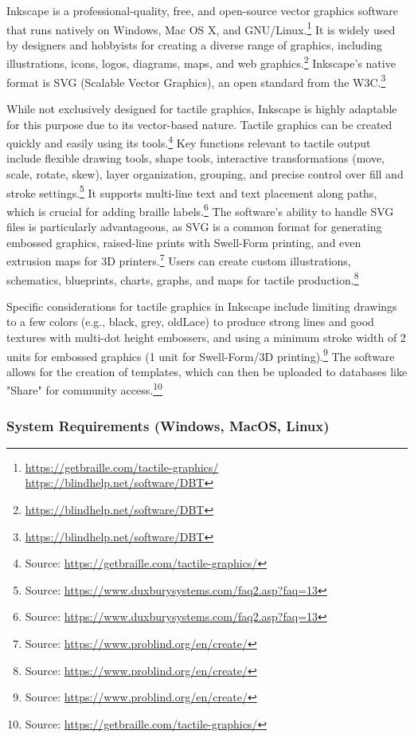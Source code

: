 Inkscape is a professional-quality, free, and open-source vector graphics software that runs natively on Windows, Mac OS X, and GNU/Linux.\footnote{\url{https://getbraille.com/tactile-graphics/} \url{https://blindhelp.net/software/DBT}} It is widely used by designers and hobbyists for creating a diverse range of graphics, including illustrations, icons, logos, diagrams, maps, and web graphics.\footnote{\url{https://blindhelp.net/software/DBT}} Inkscape's native format is SVG (Scalable Vector Graphics), an open standard from the W3C.\footnote{\url{https://blindhelp.net/software/DBT}}

While not exclusively designed for tactile graphics, Inkscape is highly adaptable for this purpose due to its vector-based nature. Tactile graphics can be created quickly and easily using its tools.\footnote{Source:  \url{https://getbraille.com/tactile-graphics/}} Key functions relevant to tactile output include flexible drawing tools, shape tools, interactive transformations (move, scale, rotate, skew), layer organization, grouping, and precise control over fill and stroke settings.\footnote{Source:  \url{https://www.duxburysystems.com/faq2.asp?faq=13}} It supports multi-line text and text placement along paths, which is crucial for adding braille labels.\footnote{Source:  \url{https://www.duxburysystems.com/faq2.asp?faq=13}} The software's ability to handle SVG files is particularly advantageous, as SVG is a common format for generating embossed graphics, raised-line prints with Swell-Form printing, and even extrusion maps for 3D printers.\footnote{Source:  \url{https://www.problind.org/en/create/}} Users can create custom illustrations, schematics, blueprints, charts, graphs, and maps for tactile production.\footnote{Source:  \url{https://www.problind.org/en/create/}}

Specific considerations for tactile graphics in Inkscape include limiting drawings to a few colors (e.g., black, grey, oldLace) to produce strong lines and good textures with multi-dot height embossers, and using a minimum stroke width of 2 units for embossed graphics (1 unit for Swell-Form/3D printing).\footnote{Source:  \url{https://www.problind.org/en/create/}} The software allows for the creation of templates, which can then be uploaded to databases like "Share" for community access.\footnote{Source:  \url{https://getbraille.com/tactile-graphics/}}

\subsubsection{System Requirements (Windows, MacOS, Linux)}

